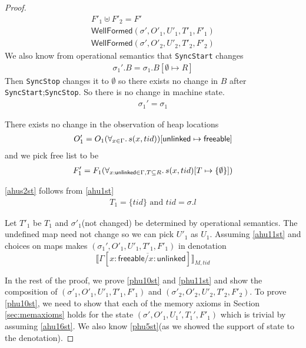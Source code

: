 \begin{proof}
\begin{gather}
F'_1 \uplus F'_2 = F'
\\
\label{phu10st}
\textsf{WellFormed}(\sigma',O'_{1},U'_{1},T'_{1},F'_1) \\
\label{phu11st}
\textsf{WellFormed}(\sigma',O'_{2},U'_{2},T'_{2}, F'_2)
\end{gather}
We also know from operational semantics that \lstinline|SyncStart| changes
\begin{gather}\label{ahuB}
  \sigma_1'.B = \sigma_1.B[\emptyset \mapsto R]
\end{gather}
Then \lstinline|SyncStop| changes it to $\emptyset$ so there exists no change in $B$ after \lstinline|SyncStart|;\lstinline|SyncStop|. So there is no change in machine state.
\begin{gather}\label{ahusst}
\sigma_1' =  \sigma_1
\end{gather}

There exists no change in the observation of heap locations
\begin{gather}\label{ahus1st}
  O'_1 =  O_1(\forall_{x \in \Gamma} \ldotp s(x,tid))[\textsf{unlinked} \mapsto \textsf{freeable}]
\end{gather}
and we pick free list to be
\begin{gather}\label{ahusF}
 F'_1 = F_1(\forall_{x:\textsf{unlinked} \in \Gamma, T\subseteq R} \ldotp s(x,tid)[ T \mapsto \{\emptyset\} ])
\end{gather}

\ref{ahus2st} follows from \ref{ahu1st}
\begin{gather}\label{ahus2st}
  T_1 = \{tid\} \text{ and } tid = \sigma.l
\end{gather}

Let $T'_1$ be $T_1$ and $\sigma'_1$(not changed) be determined by operational semantics. The undefined map need not change so we can pick $U'_1$ as $U_1$. Assuming \ref{ahu11st} and choices on maps makes $(\sigma_1',O'_{1},U'_{1}, T'_{1},F'_1)$ in denotation
\[ \llbracket \Gamma[\overline{x:\textsf{freeable}/x:\textsf{unlinked}}] \rrbracket_{M,tid}\]

In the rest of the proof, we prove \ref{phu10st} and \ref{phu11st} and show the composition of $(\sigma'_1, O'_1, U'_1,T'_1,F'_1)$ and $(\sigma'_2, O'_2, U'_2,T'_2,F'_2)$. To prove \ref{phu10st}, we need to show that each of the memory axioms in Section \ref{sec:memaxioms} holds for the state $(\sigma',O'_1,U_1',T_1',F'_1)$ which is trivial by assuming \ref{ahu16st}. We also know \ref{phu5st}(as we showed the support of state to the denotation).


\end{proof}

